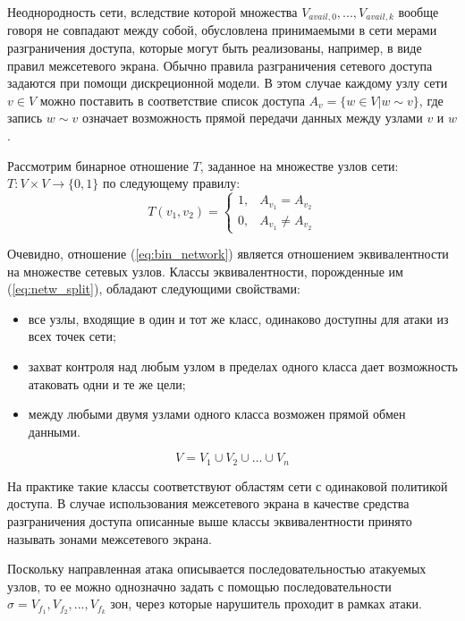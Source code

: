 Неоднородность сети, вследствие которой множества $V_{avail,0}, ... , V_{avail,k}$ вообще говоря не совпадают между собой, обусловлена принимаемыми в сети мерами разграничения доступа, которые могут быть реализованы, например, в виде правил межсетевого экрана. Обычно правила разграничения сетевого доступа задаются при помощи дискреционной модели. В этом случае каждому узлу сети $v \in V$ можно поставить в соответствие список доступа $A_v = \{ w \in V | w \sim v \}$, где запись $w \sim v$ означает возможность прямой передачи данных между узлами $v$ и $w$.
 
Рассмотрим бинарное отношение $T$, заданное на множестве узлов сети: $T: V \times V \rightarrow \{0, 1\}$ по следующему правилу:
\begin{equation}
\label{eq:bin_network}
T(v_1, v_2) = 
	\begin{cases} 
		1,  & A_{v_1} = A_{v_2} \\
		0,  & A_{v_1} \neq A_{v_2} 
	\end{cases}
\end{equation}

Очевидно, отношение (\ref{eq:bin_network}) является отношением эквивалентности на множестве сетевых узлов. Классы эквивалентности, порожденные им (\ref{eq:netw_split}), обладают следующими свойствами: 

\begin{itemize}
	\item все узлы, входящие в один и тот же класс, одинаково доступны для атаки из всех точек сети;
	\item захват контроля над любым узлом в пределах одного класса дает возможность атаковать одни и те же цели;
	\item между любыми двумя узлами одного класса возможен прямой обмен данными.
\end{itemize}

\begin{equation}
\label{eq:netw_split}
V = V_1 \cup V_2 \cup ... \cup V_n
\end{equation}

На практике такие классы соответствуют областям сети с одинаковой политикой доступа. В случае использования межсетевого экрана в качестве средства разграничения доступа описанные выше классы эквивалентности принято называть зонами межсетевого экрана.

Поскольку направленная атака описывается последовательностью атакуемых узлов, то ее можно однозначно задать с помощью последовательности $\sigma = V_{f_1}, V_{f_2}, ... , V_{f_k}$ зон, через которые нарушитель проходит в рамках атаки.

